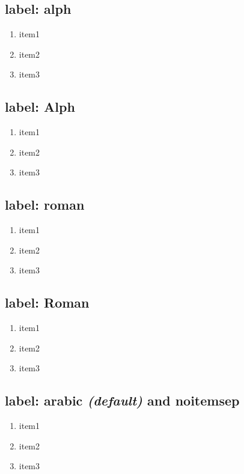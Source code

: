 \documentclass{article}
\begin{document}
	\subsection*{label: alph}
	\begin{enumerate} [label=\alph*.]
		\item item1
		\item item2
		\item item3
	\end{enumerate}

	\subsection*{label: Alph}
	\begin{enumerate} [label=\Alph*.]
		\item item1
		\item item2
		\item item3
	\end{enumerate}

	\subsection*{label: roman}
	\begin{enumerate} [label=\roman*.]
		\item item1
		\item item2
		\item item3
	\end{enumerate}

	\subsection*{label: Roman}
	\begin{enumerate} [label=\Roman*.]
		\item item1
		\item item2
		\item item3
	\end{enumerate}

	\subsection*{label: arabic \textit{(default)} and noitemsep}
	\begin{enumerate} [label=\arabic*.,noitemsep]
		\item item1
		\item item2
		\item item3
	\end{enumerate}
	\newpage
\end{document}
